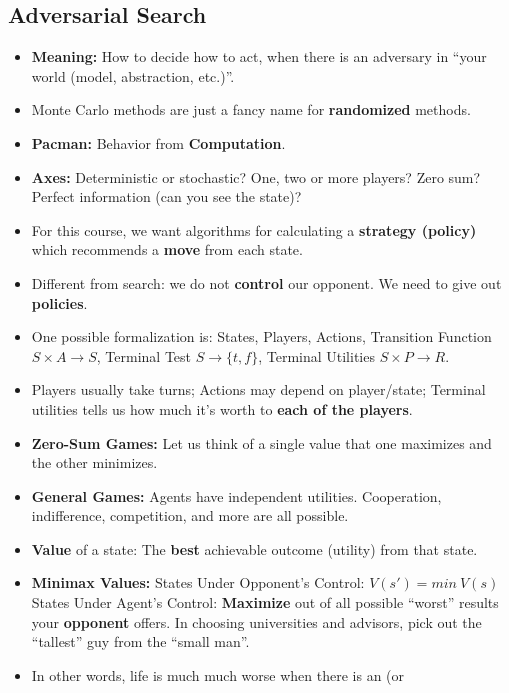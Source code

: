 \documentclass[twocolumn]{article}
\begin{document}
\subsection{Adversarial Search}
\label{sec:adversarial-search}

\begin{itemize}
\item \textbf{Meaning:} How to decide how to act, when there is an
  adversary in ``your world (model, abstraction, etc.)''.
\item Monte Carlo methods are just a fancy name for
  \textbf{randomized} methods.
\item \textbf{Pacman:} Behavior from \textbf{Computation}.
\item \textbf{Axes:} Deterministic or stochastic? One, two or more
  players? Zero sum? Perfect information (can you see the state)?
\item For this course, we want algorithms for calculating a
  \textbf{strategy (policy)} which recommends a \textbf{move} from
  each state.
\item Different from search: we do not \textbf{control} our
  opponent. We need to give out \textbf{policies}.
\item One possible formalization is: States, Players, Actions,
  Transition Function $S\times A\rightarrow S$, Terminal Test $S\rightarrow
  \{t,f\}$, Terminal Utilities $S\times P\rightarrow R$.
\item Players usually take turns; Actions may depend on player/state;
  Terminal utilities tells us how much it's worth to \textbf{each of
    the players}. 
\item \textbf{Zero-Sum Games:} Let us think of a single value that one
  maximizes and the other minimizes.
\item \textbf{General Games:} Agents have independent
  utilities. Cooperation, indifference, competition, and more are all
  possible. 
\item  \textbf{Value} of a state: The \textbf{best} achievable outcome
  (utility) from that state.
\item \textbf{Minimax Values:} States Under Opponent's Control:
  $V(s')= min~V(s)$ States Under Agent's Control: \textbf{Maximize}
  out of all possible ``worst'' results your \textbf{opponent}
  offers. In choosing universities and advisors, pick out the
  ``tallest'' guy from the ``small man''. 
\item In other words, life is much much worse when there is an (or

\end{itemize}
\end{document}
